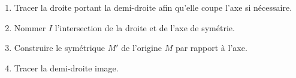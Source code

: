 \begin{methode*1}
\begin{minipage}{0.65\linewidth}
\begin{enumerate}
                \item Tracer la droite portant la demi-droite afin qu'elle coupe l'axe si nécessaire.
                \item Nommer $I$ l'intersection de la droite et de l'axe de symétrie.
                \item Construire le symétrique $M'$ de l'origine $M$ par rapport à l'axe.
                \item Tracer la demi-droite image.
            \end{enumerate}
        \end{minipage}
        \begin{myBox}{}
            \begin{minipage}{\linewidth}
            
                \creditInstrumentPoche
            \end{minipage}
        \end{myBox}
    \end{methode*1}
